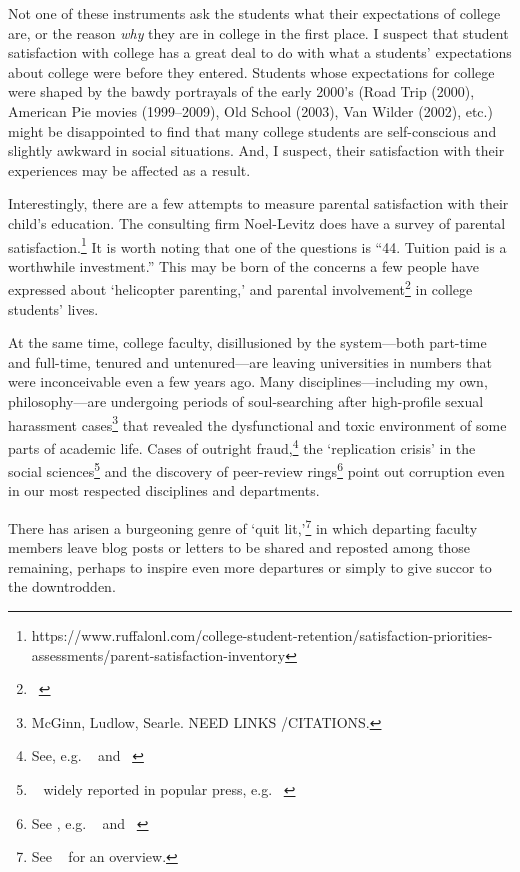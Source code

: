 Not one of these instruments ask the students what their expectations of college are, or the reason \emph{why} they are in college in the first place. I suspect that student satisfaction with college has a great deal to do with what a students' expectations about college were before they entered. Students whose expectations for college were shaped by the bawdy portrayals of the early 2000's (Road Trip (2000), American Pie movies (1999--2009), Old School (2003), Van Wilder (2002), etc.) might be disappointed to find that many college students are self-conscious and slightly awkward in social situations. And, I suspect, their satisfaction with their experiences may be affected as a result.

Interestingly, there are a few attempts to measure parental satisfaction with their child's education. The consulting firm Noel-Levitz does have a survey of parental satisfaction.\footnote{https:\slash \slash www.ruffalonl.com\slash college-student-retention\slash satisfaction-priorities-assessments\slash parent-satisfaction-inventory} It is worth noting that one of the questions is ``44. Tuition paid is a worthwhile investment.'' This may be born of the concerns a few people have expressed about `helicopter parenting,' and parental involvement\footnote{~\citep{Edelman:2013ul}} in college students' lives.

At the same time, college faculty, disillusioned by the system---both part-time and full-time, tenured and untenured---are leaving universities in numbers that were inconceivable even a few years ago. Many disciplines---including my own, philosophy---are undergoing periods of soul-searching after high-profile sexual harassment cases\footnote{McGinn, Ludlow, Searle. NEED LINKS \slash  CITATIONS.} that revealed the dysfunctional and toxic environment of some parts of academic life. Cases of outright fraud,\footnote{See, e.g. ~\citep{Feltman:2015vh} and ~\citep{Carpenter:2012tf}} the `replication crisis' in the social sciences\footnote{~\citep{Collaboration:2015cn} widely reported in popular press, e.g. ~\citep{Baker:2015bs}} and the discovery of peer-review rings\footnote{See , e.g. ~\citep{Barbash:2014uy} and ~\citep{Feltman:2015vh}} point out corruption even in our most respected disciplines and departments. 

There has arisen a burgeoning genre of `quit lit,'\footnote{See ~\citep{Flaherty:2015tj} for an overview.} in which departing faculty members leave blog posts or letters to be shared and reposted among those remaining, perhaps to inspire even more departures or simply to give succor to the downtrodden.

